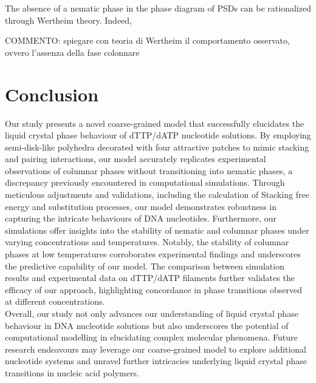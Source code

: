 \documentclass[aip,jcp, amsmath, amssymb, reprint]{revtex4-1}
\begin{document}
The absence of a nematic phase in the phase diagram of PSDs can be rationalized through Wertheim theory.
Indeed,


{\color{green}COMMENTO: spiegare con teoria di Wertheim il comportamento osservato, ovvero
l'assenza della fase colonnare}



\section{\label{Dis}Conclusion}

Our study presents a novel coarse-grained model that successfully elucidates the liquid crystal phase behaviour of dTTP/dATP nucleotide solutions. By employing semi-disk-like polyhedra decorated with four attractive patches to mimic stacking and pairing interactions, our model accurately replicates experimental observations of columnar phases without transitioning into nematic phases, a discrepancy previously encountered in computational simulations. Through meticulous adjustments and validations, including the calculation of Stacking free energy and substitution processes, our model demonstrates robustness in capturing the intricate behaviours of DNA nucleotides. Furthermore, our simulations offer insights into the stability of nematic and columnar phases under varying concentrations and temperatures. Notably, the stability of columnar phases at low temperatures corroborates experimental findings and underscores the predictive capability of our model. The comparison between simulation results and experimental data on dTTP/dATP filaments further validates the efficacy of our approach, highlighting concordance in phase transitions observed at different concentrations. \\

Overall, our study not only advances our understanding of liquid crystal phase behaviour in DNA nucleotide solutions but also underscores the potential of computational modelling in elucidating complex molecular phenomena. Future research endeavours may leverage our coarse-grained model to explore additional nucleotide systems and unravel further intricacies underlying liquid crystal phase transitions in nucleic acid polymers.



\end{document}
